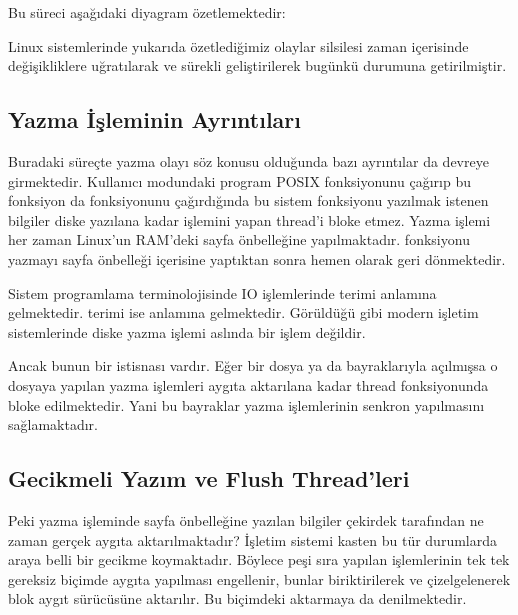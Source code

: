 \documentclass[a4paper,10pt,turkish]{sphinxmanual}
\begin{document}
\sphinxAtStartPar
Bu süreci aşağıdaki diyagram özetlemektedir:


\sphinxAtStartPar
Linux sistemlerinde yukarıda özetlediğimiz olaylar silsilesi zaman içerisinde değişikliklere
uğratılarak ve sürekli geliştirilerek bugünkü durumuna getirilmiştir.


\subsection{Yazma İşleminin Ayrıntıları}
\label{\detokenize{filesystem1:yazma-isleminin-ayrintilari}}
\sphinxAtStartPar
Buradaki süreçte yazma olayı söz konusu olduğunda bazı ayrıntılar da devreye girmektedir.
Kullanıcı modundaki program  POSIX fonksiyonunu çağırıp bu fonksiyon da 
fonksiyonunu çağırdığında bu sistem fonksiyonu yazılmak istenen bilgiler diske yazılana kadar
 işlemini yapan thread’i bloke etmez. Yazma işlemi her zaman Linux’un RAM’deki sayfa
önbelleğine yapılmaktadır.  fonksiyonu yazmayı sayfa önbelleği içerisine yaptıktan
sonra hemen  olarak geri dönmektedir.

\sphinxAtStartPar
Sistem programlama terminolojisinde IO işlemlerinde  terimi  anlamına gelmektedir.  terimi ise  anlamına
gelmektedir. Görüldüğü gibi modern işletim sistemlerinde diske yazma işlemi aslında 
bir işlem değildir.

\sphinxAtStartPar
Ancak bunun bir istisnası vardır. Eğer bir dosya  ya da  bayraklarıyla
açılmışsa o dosyaya yapılan yazma işlemleri aygıta aktarılana kadar thread  fonksiyonunda
bloke edilmektedir. Yani bu bayraklar yazma işlemlerinin senkron yapılmasını sağlamaktadır.


\subsection{Gecikmeli Yazım ve Flush Thread’leri}
\label{\detokenize{filesystem1:gecikmeli-yazim-ve-flush-thread-leri}}
\sphinxAtStartPar
Peki yazma işleminde sayfa önbelleğine yazılan bilgiler çekirdek tarafından ne zaman gerçek
aygıta aktarılmaktadır? İşletim sistemi kasten bu tür durumlarda araya belli bir gecikme
koymaktadır. Böylece peşi sıra yapılan  işlemlerinin tek tek gereksiz biçimde aygıta
yapılması engellenir, bunlar biriktirilerek ve çizelgelenerek blok aygıt sürücüsüne aktarılır.
Bu biçimdeki aktarmaya  da denilmektedir.
\end{document}
